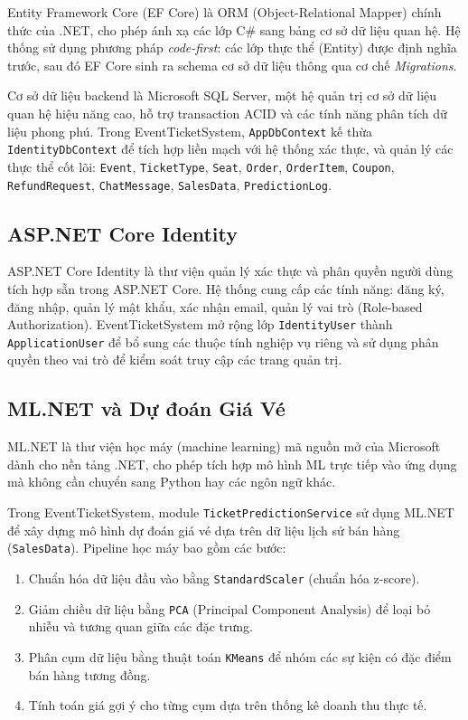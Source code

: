 \documentclass[../main.tex]{subfiles}
\begin{document}
Entity Framework Core (EF Core) là ORM (Object-Relational Mapper) chính thức của .NET, cho phép ánh xạ các lớp C\# sang bảng cơ sở dữ liệu quan hệ. Hệ thống sử dụng phương pháp \textit{code-first}: các lớp thực thể (Entity) được định nghĩa trước, sau đó EF Core sinh ra schema cơ sở dữ liệu thông qua cơ chế \textit{Migrations}.

Cơ sở dữ liệu backend là Microsoft SQL Server, một hệ quản trị cơ sở dữ liệu quan hệ hiệu năng cao, hỗ trợ transaction ACID và các tính năng phân tích dữ liệu phong phú. Trong EventTicketSystem, \texttt{AppDbContext} kế thừa \texttt{IdentityDbContext} để tích hợp liền mạch với hệ thống xác thực, và quản lý các thực thể cốt lõi: \texttt{Event}, \texttt{TicketType}, \texttt{Seat}, \texttt{Order}, \texttt{OrderItem}, \texttt{Coupon}, \texttt{RefundRequest}, \texttt{ChatMessage}, \texttt{SalesData}, \texttt{PredictionLog}.

\subsection{ASP.NET Core Identity}

ASP.NET Core Identity là thư viện quản lý xác thực và phân quyền người dùng tích hợp sẵn trong ASP.NET Core. Hệ thống cung cấp các tính năng: đăng ký, đăng nhập, quản lý mật khẩu, xác nhận email, quản lý vai trò (Role-based Authorization). EventTicketSystem mở rộng lớp \texttt{IdentityUser} thành \texttt{ApplicationUser} để bổ sung các thuộc tính nghiệp vụ riêng và sử dụng phân quyền theo vai trò để kiểm soát truy cập các trang quản trị.

\subsection{ML.NET và Dự đoán Giá Vé}

ML.NET là thư viện học máy (machine learning) mã nguồn mở của Microsoft dành cho nền tảng .NET, cho phép tích hợp mô hình ML trực tiếp vào ứng dụng mà không cần chuyển sang Python hay các ngôn ngữ khác.

Trong EventTicketSystem, module \texttt{TicketPredictionService} sử dụng ML.NET để xây dựng mô hình dự đoán giá vé dựa trên dữ liệu lịch sử bán hàng (\texttt{SalesData}). Pipeline học máy bao gồm các bước:
\begin{enumerate}
    \item Chuẩn hóa dữ liệu đầu vào bằng \texttt{StandardScaler} (chuẩn hóa z-score).
    \item Giảm chiều dữ liệu bằng \texttt{PCA} (Principal Component Analysis) để loại bỏ nhiễu và tương quan giữa các đặc trưng.
    \item Phân cụm dữ liệu bằng thuật toán \texttt{KMeans} để nhóm các sự kiện có đặc điểm bán hàng tương đồng.
    \item Tính toán giá gợi ý cho từng cụm dựa trên thống kê doanh thu thực tế.
\end{enumerate}
\end{document}

